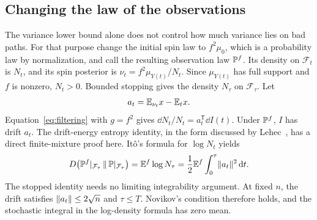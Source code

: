 \subsection{Changing the law of the observations}
The variance lower bound alone does not control how much variance lies on
bad paths. For that purpose change the initial spin law to $f^2\mu_0$,
which is a probability law by normalization, and call the resulting
observation law $\mathbb P^f$. Its density on $\mathcal F_t$ is $N_t$, and
its spin posterior is $\nu_t=f^2\mu_{Y(t)}/N_t$. Since $\mu_{Y(t)}$ has
full support and $f$ is nonzero, $N_t>0$. Bounded stopping gives the
density $N_\tau$ on $\mathcal F_\tau$.
Let
\[
 a_t=\mathbb E_{\nu_t}x-\mathbb E_t x.
\]
Equation~\eqref{eq:filtering} with $g=f^2$ gives
$\dd N_t/N_t=a_t^{\mathsf T}\dd I(t)$. Under $\mathbb P^f$, $I$ has drift $a_t$.
The drift-energy entropy identity, in the form discussed
by Lehec~\cite{Lehec2013}, has a direct finite-mixture proof here.
It\^o's formula for $\log N_t$ yields
\begin{equation}\label{eq:stopped-entropy}
 D\bigl(\mathbb P^f|_{\mathcal F_\tau}\,\Vert\,
        \mathbb P|_{\mathcal F_\tau}\bigr)
 =\mathbb E^f\log N_\tau
 =\frac12\mathbb E^f\int_0^\tau\lVert a_t\rVert^2\,\mathrm d t.
\end{equation}
The stopped identity needs no limiting integrability argument. At fixed
$n$, the drift satisfies $\lVert a_t\rVert\le2\sqrt n$ and $\tau\le T$.
Novikov's condition therefore holds, and the stochastic integral in the
log-density formula has zero mean.

